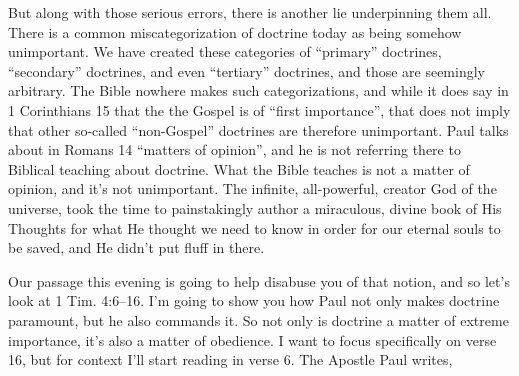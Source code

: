 \documentclass[letterpaper, 12pt]{article}
\begin{document}
    But along with those serious errors, there is another lie
    underpinning them all. There is a common miscategorization of
    doctrine today as being somehow unimportant. We have created these
    categories of ``primary'' doctrines, ``secondary'' doctrines, and
    even ``tertiary'' doctrines, and those are seemingly arbitrary. The
    Bible nowhere makes such categorizations, and while it does say in 1
    Corinthians 15 that the the Gospel is of ``first importance'', that
    does not imply that other so-called ``non-Gospel'' doctrines are
    therefore unimportant. Paul talks about in Romans 14 ``matters of
    opinion'', and he is not referring there to Biblical teaching about
    doctrine. What the Bible teaches is not a matter of opinion, and
    it's not unimportant. The infinite, all-powerful, creator God of the
    universe, took the time to painstakingly author a miraculous, divine
    book of His Thoughts for what He thought we need to know in order
    for our eternal souls to be saved, and He didn't put fluff in there.

    Our passage this evening is going to help disabuse you of that
    notion, and so let's look at 1 Tim. 4:6--16. I'm going to show you
    how Paul not only makes doctrine paramount, but he also commands it.
    So not only is doctrine a matter of extreme importance, it's also a
    matter of obedience. I want to focus specifically on verse 16, but
    for context I'll start reading in verse 6. The Apostle Paul writes,
\end{document}
